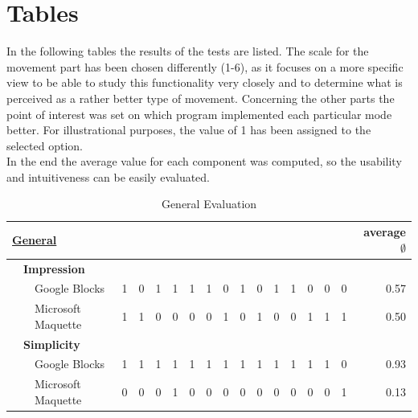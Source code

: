 \documentclass{report}
\begin{document}
	\section{Tables}		
		In the following tables the results of the tests are listed. The scale for the movement part has been chosen differently (1-6), as it focuses on a more specific view to be able to study this functionality very closely and to determine what is perceived as a rather better type of movement. Concerning the other parts the point of interest was set on which program implemented each particular mode better. For illustrational purposes, the value of 1 has been assigned to the selected option. \\
		In the end the average value for each component was computed, so the usability and intuitiveness can be easily evaluated. \\			
		\begin{table}[H]
			\begin{tabular}{@{}|lll|llllllllllllll|r|@{}}
				\hline
				\multicolumn{3}{|l|}{\textbf{\underline{General}}} & & & & & & & & & & & & & & & \textbf{average $\emptyset$} \\ \hline
				& \multicolumn{2}{l|}{\textbf{Impression}} & & & & & & & & & & & & & & &\\ \hline
				& & Google Blocks & 1 & 0 & 1 & 1 & 1 & 1 & 0 & 1 & 0 & 1 & 1 & 0 & 0 & 0 & 0.57 \\
				& & Microsoft Maquette & 1 & 1 & 0 & 0 & 0 & 0 & 1 & 0 & 1 & 0 & 0 & 1 & 1 & 1 & 0.50 \\ \hline
				
				& \multicolumn{2}{l|}{\textbf{Simplicity}} & & & & & & & & & & & & & & &\\ \hline
				& & Google Blocks & 1 & 1 & 1 & 1 & 1 & 1 & 1 & 1 & 1 & 1 & 1 & 1 & 1 & 0 & 0.93 \\
				& & Microsoft Maquette & 0 & 0 & 0 & 1 & 0 & 0 & 0 & 0 & 0 & 0 & 0 & 0 & 0 & 1 & 0.13 \\ \hline
			\end{tabular}
			\caption{General Evaluation}
			\label{tab:tab3.1}
		\end{table}
		
\end{document}
